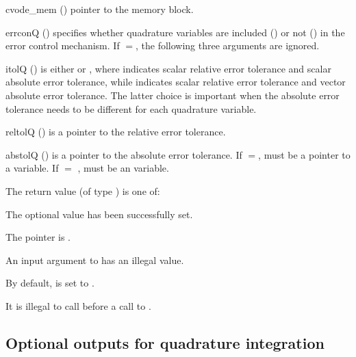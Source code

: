 {
  \begin{args}
  \item[cvode\_mem] ()
    pointer to the {\cvodes} memory block.
  \item[errconQ] ()
    specifies whether quadrature variables are included () or not
    () in the error control mechanism. If $=$,
    the following three arguments are ignored.
  \item[itolQ] () 
    is either  or , where   indicates 
    scalar relative error tolerance and scalar absolute error tolerance, 
    while  indicates scalar relative error tolerance and 
    vector absolute error tolerance. 
    The latter choice is important when the absolute error tolerance needs to
    be different for each quadrature variable.
  \item[reltolQ] ()
    is a pointer to the relative error tolerance.
  \item[abstolQ] ()
    is a pointer to the absolute error tolerance.  If $=$,
     must be a pointer to a  variable. If
     $=$ ,  must be an  variable.
  \item
  \end{args}
}
{
  The return value  (of type ) is one of:
  \begin{args}
  \item[\Id{CV\_SUCCESS}] 
    The optional value has been successfully set.
  \item[\Id{CV\_MEM\_NULL}]
    The  pointer is .
  \item[\Id{CV\_ILL\_INPUT}] 
    An input argument to  has an illegal value.
  \end{args}
}
{
  By default,  is set to . 

  {\warn}It is illegal to call  before a call 
  to .
}


\subsection{Optional outputs for quadrature integration}\label{ss:quad_optional_output}

